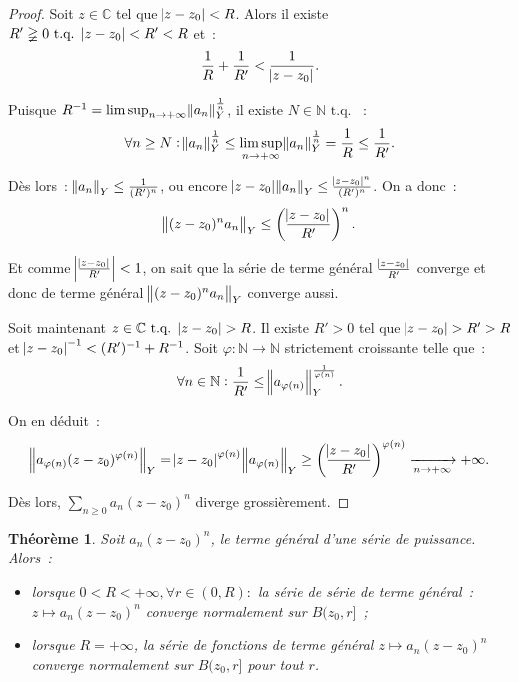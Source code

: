 \documentclass{report}
\newtheorem{thm}{Théorème}[chapter]
\theoremstyle{definition}
\theoremstyle{remark}
\newcommand{\C}{\mathbb C}
\newcommand{\N}{\mathbb N}
\newcommand{\tq}{\text{ t.q. }}
\newcommand{\pinfty}{{+\infty}}
\begin{document}
			\begin{proof} Soit $z \in \C$ tel que $\abs {z - z_0} < R$. Alors il existe $R' \gneqq 0 \tq \abs {z - z_0} < R' < R$ et~:
			\[\frac 1R + \frac 1{R'} < \frac 1{\abs {z - z_0}}.\]

			Puisque $R^{-1} = \limsup_{n \to \pinfty}\norm{a_n}_Y^{\frac 1n}$, il existe $N \in \N \tq$~:
			\[\forall n \geq N : \norm {a_n}_Y^{\frac 1n} \leq \limsup_{n \to \pinfty} \norm {a_n}_Y^{\frac 1n} = \frac 1R \leq \frac 1{R'}.\]

			Dès lors~: $\norm {a_n}_Y \leq \frac 1{(R')^n}$, ou encore $\abs {z - z_0}\norm {a_n}_Y \leq \frac {\abs {z - z_0}^n}{(R')^n}$. On a donc~:
			\[\norm {(z-z_0)^na_n}_Y \leq \left(\frac {\abs {z - z_0}}{R'}\right)^n.\]

			Et comme $\abs {\frac {\abs {z - z_0}}{R'}} < 1$, on sait que la série de terme général $\frac {\abs {z - z_0}}{R'}$ converge et donc de terme
			général $\norm {(z - z_0)^na_n}_Y$ converge aussi.

			Soit maintenant $z \in \C \tq \abs {z - z_0} > R$. Il existe $R' > 0$ tel que $\abs {z - z_0} > R' > R$ et $\abs {z - z_0}^{-1} < (R')^{-1} + R^{-1}$.
			Soit $\varphi: \N \to \N$ strictement croissante telle que~:
			\[\forall n \in \N : \frac 1{R'} \leq \norm {a_{\varphi(n)}}_Y^{\frac 1{\varphi(n)}}.\]

			On en déduit~:
			\[\norm {a_{\varphi(n)}(z - z_0)^{\varphi(n)}}_Y = \abs {z - z_0}^{\varphi(n)}\norm {a_{\varphi(n)}}_Y
				\geq \left(\frac {\abs {z - z_0}}{R'}\right)^{\varphi(n)} \xrightarrow[n \to \pinfty]{} \pinfty.\]

			Dès lors, $\sum_{n \geq 0}a_n(z - z_0)^n$ diverge grossièrement.
			\end{proof}

			\begin{thm}\label{thm:cvnsurrayondeconvergence} Soit $a_n(z - z_0)^n$, le terme général d'une série de puissance. Alors~:
			\begin{itemize}
				\item lorsque $0 < R < \pinfty, \forall r \in (0, R) :$ la série de série de terme général~: $z \mapsto a_n(z - z_0)^n$ converge normalement
				sur $B(z_0, r]$~;
				\item lorsque $R = \pinfty$, la série de fonctions de terme général $z \mapsto a_n(z - z_0)^n$ converge normalement sur $B(z_0, r]$ pour tout $r$.
			\end{itemize}
			\end{thm}
\end{document}
